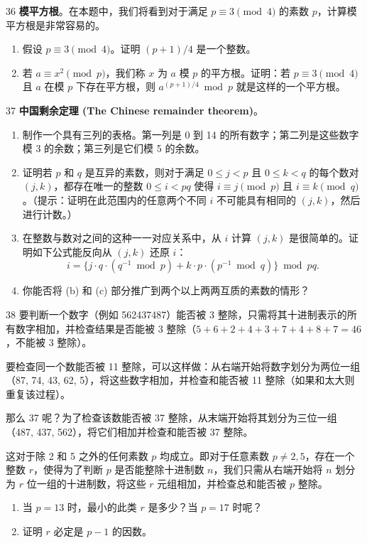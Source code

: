 \begin{exercise}{36}
\textbf{模平方根}。在本题中，我们将看到对于满足 $p \equiv 3 \pmod 4$ 的素数 $p$，计算模平方根是非常容易的。
\begin{enumerate}
    \item[(a)] 假设 $p \equiv 3 \pmod 4$。证明 $(p + 1)/4$ 是一个整数。
    \item[(b)] 若 $a \equiv x^2 \pmod p$，我们称 $x$ 为 $a$ 模 $p$ 的平方根。证明：若 $p \equiv 3 \pmod 4$ 且 $a$ 在模 $p$ 下存在平方根，则 $a^{(p+1)/4} \bmod p$ 就是这样的一个平方根。
\end{enumerate}
\end{exercise}

\begin{exercise}{37}
\textbf{中国剩余定理 (The Chinese remainder theorem)}。
\begin{enumerate}
    \item[(a)] 制作一个具有三列的表格。第一列是 0 到 14 的所有数字；第二列是这些数字模 3 的余数；第三列是它们模 5 的余数。
    \item[(b)] 证明若 $p$ 和 $q$ 是互异的素数，则对于满足 $0 \le j < p$ 且 $0 \le k < q$ 的每个数对 $(j, k)$，都存在唯一的整数 $0 \le i < pq$ 使得 $i \equiv j \pmod p$ 且 $i \equiv k \pmod q$。（提示：证明在此范围内的任意两个不同 $i$ 不可能具有相同的 $(j, k)$，然后进行计数。）
    \item[(c)] 在整数与数对之间的这种一一对应关系中，从 $i$ 计算 $(j, k)$ 是很简单的。证明如下公式能反向从 $(j, k)$ 还原 $i$：
    \[
    i = \{ j \cdot q \cdot (q^{-1} \bmod p) + k \cdot p \cdot (p^{-1} \bmod q) \} \bmod pq.
    \]
    \item[(d)] 你能否将 (b) 和 (c) 部分推广到两个以上两两互质的素数的情形？
\end{enumerate}
\end{exercise}

\begin{exercise}{38}
要判断一个数字（例如 562437487）能否被 3 整除，只需将其十进制表示的所有数字相加，并检查结果是否能被 3 整除（$5 + 6 + 2 + 4 + 3 + 7 + 4 + 8 + 7 = 46$，不能被 3 整除）。

要检查同一个数能否被 11 整除，可以这样做：从右端开始将数字划分为两位一组（87, 74, 43, 62, 5），将这些数字相加，并检查和能否被 11 整除（如果和太大则重复该过程）。

那么 37 呢？为了检查该数能否被 37 整除，从末端开始将其划分为三位一组（487, 437, 562），将它们相加并检查和能否被 37 整除。

这对于除 2 和 5 之外的任何素数 $p$ 均成立。即对于任意素数 $p \ne 2, 5$，存在一个整数 $r$，使得为了判断 $p$ 是否能整除十进制数 $n$，我们只需从右端开始将 $n$ 划分为 $r$ 位一组的十进制数，将这些 $r$ 元组相加，并检查总和能否被 $p$ 整除。
\begin{enumerate}
    \item[(a)] 当 $p = 13$ 时，最小的此类 $r$ 是多少？当 $p = 17$ 时呢？
    \item[(b)] 证明 $r$ 必定是 $p - 1$ 的因数。
\end{enumerate}
\end{exercise}

